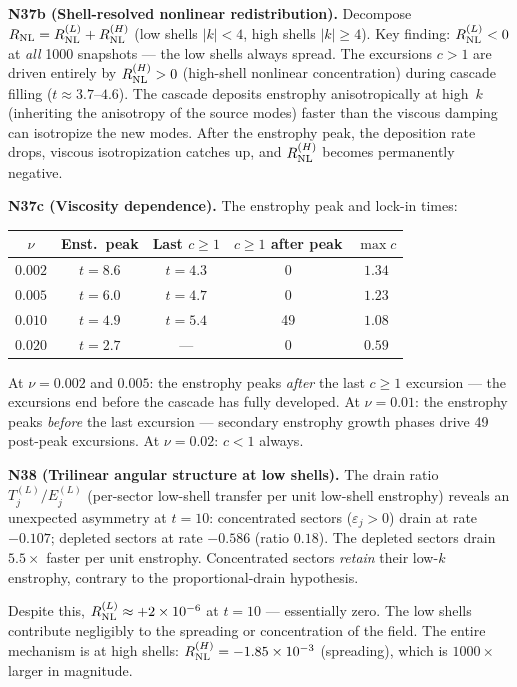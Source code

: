 \documentclass[11pt]{article}
\theoremstyle{definition}
\begin{document}
\medskip\noindent\textbf{N37b (Shell-resolved
nonlinear redistribution).}
Decompose $R_{\rm NL} = R_{\rm NL}^{(L)}
+R_{\rm NL}^{(H)}$ (low shells $|k|<4$, high
shells $|k|\geq 4$).  Key finding:
$R_{\rm NL}^{(L)}<0$ at \emph{all} 1000 snapshots
--- the low shells always spread.  The excursions
$c>1$ are driven entirely by $R_{\rm NL}^{(H)}>0$
(high-shell nonlinear concentration) during cascade
filling ($t\approx 3.7$--$4.6$).  The cascade
deposits enstrophy anisotropically at high~$k$
(inheriting the anisotropy of the source modes)
faster than the viscous damping can isotropize the
new modes.  After the enstrophy peak, the deposition
rate drops, viscous isotropization catches up, and
$R_{\rm NL}^{(H)}$ becomes permanently negative.

\medskip\noindent\textbf{N37c (Viscosity dependence).}
The enstrophy peak and lock-in times:
\begin{center}
\renewcommand{\arraystretch}{1.2}
\begin{tabular}{@{}ccccc@{}}
\toprule
$\nu$ & Enst.\ peak & Last $c\geq 1$
  & $c\geq 1$ after peak & $\max c$ \\
\midrule
$0.002$ & $t=8.6$ & $t=4.3$ & 0 & $1.34$ \\
$0.005$ & $t=6.0$ & $t=4.7$ & 0 & $1.23$ \\
$0.010$ & $t=4.9$ & $t=5.4$ & 49 & $1.08$ \\
$0.020$ & $t=2.7$ & --- & 0 & $0.59$ \\
\bottomrule
\end{tabular}
\end{center}
At $\nu=0.002$ and $0.005$: the enstrophy peaks
\emph{after} the last $c\geq 1$ excursion --- the
excursions end before the cascade has fully
developed.  At $\nu=0.01$: the enstrophy peaks
\emph{before} the last excursion --- secondary
enstrophy growth phases drive 49 post-peak
excursions.  At $\nu=0.02$: $c<1$ always.

\medskip\noindent\textbf{N38 (Trilinear angular
structure at low shells).}
The drain ratio $T_j^{(L)}/E_j^{(L)}$ (per-sector
low-shell transfer per unit low-shell enstrophy)
reveals an unexpected asymmetry at $t=10$:
concentrated sectors ($\varepsilon_j>0$) drain at
rate $-0.107$; depleted sectors at rate $-0.586$
(ratio $0.18$).  The depleted sectors drain
$5.5\times$ faster per unit enstrophy.
Concentrated sectors \emph{retain} their low-$k$
enstrophy, contrary to the proportional-drain
hypothesis.

Despite this, $R_{\rm NL}^{(L)}\approx
+2\times 10^{-6}$ at $t=10$ --- essentially zero.
The low shells contribute negligibly to the
spreading or concentration of the field.  The
entire mechanism is at high shells:
$R_{\rm NL}^{(H)} = -1.85\times 10^{-3}$
(spreading), which is $1000\times$ larger in
magnitude.
\end{document}
